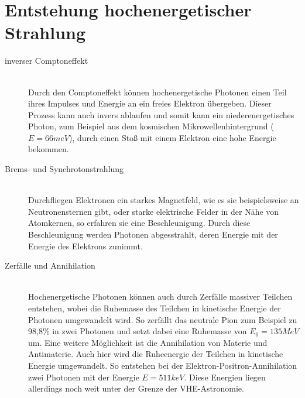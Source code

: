 \section{Entstehung hochenergetischer Strahlung}
\begin{description}
\item[inverser Comptoneffekt]\hfill \\
Durch den Comptoneffekt können hochenergetische Photonen einen Teil ihres Impulses und Energie an ein freies Elektron übergeben. Dieser Prozess kann auch invers ablaufen und somit kann ein niederenergetisches Photon, zum Beispiel aus dem kosmischen Mikrowellenhintergrund ($E=66\unit{meV}$), durch einen Stoß mit einem Elektron eine hohe Energie bekommen.
\item[Brems- und Synchrotonstrahlung]\hfill \\
Durchfliegen Elektronen ein starkes Magnetfeld, wie es sie beispielsweise an Neutronensternen gibt, oder starke elektrische Felder in der Nähe von Atomkernen, so erfahren sie eine Beschleunigung. Durch diese Beschleunigung werden Photonen abgesstrahlt, deren Energie mit der Energie des Elektrons zunimmt.
\item[Zerfälle und Annihilation]\hfill \\ 
Hochenergetische Photonen können auch durch Zerfälle massiver Teilchen entstehen, wobei die Ruhemasse des Teilchen in kinetische Energie der Photonen umgewandelt wird. So zerfällt das neutrale Pion zum Beispiel zu 98,8\%  in zwei Photonen und setzt dabei eine Ruhemasse von $E_0=135\unit{MeV}$ \cite{PDG} um. Eine weitere Möglichkeit ist die Annihilation von Materie und Antimaterie. Auch hier wird die Ruheenergie der Teilchen in kinetische Energie umgewandelt. So entstehen bei der Elektron-Positron-Annihilation zwei Photonen mit der Energie $E=511\unit{keV}$.
Diese Energien liegen allerdings noch weit unter der Grenze der VHE-Astronomie.
\end{description}

